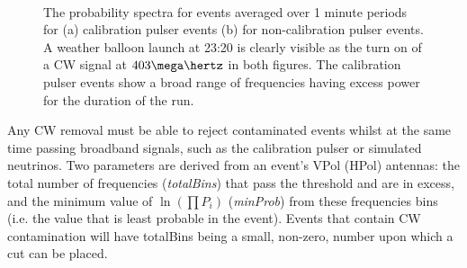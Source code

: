 \begin{figure}[htpb]
  \hfill
  \\
  \hfill
  \caption{The probability spectra for events averaged over 1 minute periods for (a) calibration pulser events (b) for non-calibration pulser events. A weather balloon launch at 23:20 is clearly visible as the turn on of a CW signal at $403 \mega \hertz$ in both figures. The calibration pulser events show a broad range of frequencies having excess power for the duration of the run.}
  \label{fig:analysis:CWRemoval:Filtering:CW-Time}
\end{figure}


Any CW removal must be able to reject contaminated events whilst at the same time passing broadband signals, such as the calibration pulser or simulated neutrinos. Two parameters are derived from an event's VPol (HPol) antennas: the total number of frequencies (\textit{totalBins}) that pass the threshold and are in excess, and the minimum value of $\ln(\prod P_{i})$ (\textit{minProb}) from these frequencies bins (i.e. the value that is least probable in the event). Events that contain CW contamination will have totalBins being a small, non-zero, number upon which a cut can be placed. 

